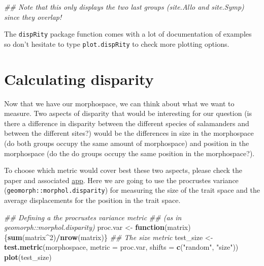 \documentclass[]{book}
\newenvironment{Shaded}{\begin{snugshade}}{\end{snugshade}}
\newcommand{\CommentTok}[1]{\textcolor[rgb]{0.56,0.35,0.01}{\textit{#1}}}
\newcommand{\ControlFlowTok}[1]{\textcolor[rgb]{0.13,0.29,0.53}{\textbf{#1}}}
\newcommand{\DataTypeTok}[1]{\textcolor[rgb]{0.13,0.29,0.53}{#1}}
\newcommand{\DecValTok}[1]{\textcolor[rgb]{0.00,0.00,0.81}{#1}}
\newcommand{\KeywordTok}[1]{\textcolor[rgb]{0.13,0.29,0.53}{\textbf{#1}}}
\newcommand{\NormalTok}[1]{#1}
\newcommand{\OperatorTok}[1]{\textcolor[rgb]{0.81,0.36,0.00}{\textbf{#1}}}
\newcommand{\StringTok}[1]{\textcolor[rgb]{0.31,0.60,0.02}{#1}}
\begin{document}
\begin{Shaded}
\begin{Highlighting}[]
\CommentTok{## Note that this only displays the two last groups (site.Allo and site.Symp) since they overlap!}
\end{Highlighting}
\end{Shaded}

The \texttt{dispRity} package function comes with a lot of documentation of examples so don't hesitate to type \texttt{plot.dispRity} to check more plotting options.

\hypertarget{calculating-disparity-2}{%
\section{Calculating disparity}\label{calculating-disparity-2}}

Now that we have our morphospace, we can think about what we want to measure.
Two aspects of disparity that would be interesting for our question (is there a difference in disparity between the different species of salamanders and between the different sites?) would be the differences in size in the morphospace (do both groups occupy the same amount of morphospace) and position in the morphospace (do the do groups occupy the same position in the morphospace?).

To choose which metric would cover best these two aspects, please check the \citet{moms} paper and associated \href{https://tguillerme.shinyapps.io/moms/}{app}. Here we are going to use the procrustes variance (\texttt{geomorph::morphol.disparity}) for measuring the size of the trait space and the average displacements \citep{moms} for the position in the trait space.

\begin{Shaded}
\begin{Highlighting}[]
\CommentTok{## Defining a the procrustes variance metric}
\CommentTok{## (as in geomorph::morphol.disparity)}
\NormalTok{proc.var <-}\StringTok{ }\ControlFlowTok{function}\NormalTok{(matrix) \{}\KeywordTok{sum}\NormalTok{(matrix}\OperatorTok{^}\DecValTok{2}\NormalTok{)}\OperatorTok{/}\KeywordTok{nrow}\NormalTok{(matrix)\}}
\CommentTok{## The size metric}
\NormalTok{test_size <-}\StringTok{ }\KeywordTok{test.metric}\NormalTok{(morphospace, }\DataTypeTok{metric =}\NormalTok{ proc.var,}
                         \DataTypeTok{shifts =} \KeywordTok{c}\NormalTok{(}\StringTok{"random"}\NormalTok{, }\StringTok{"size"}\NormalTok{))}
\KeywordTok{plot}\NormalTok{(test_size)}
\end{Highlighting}
\end{Shaded}
\end{document}

